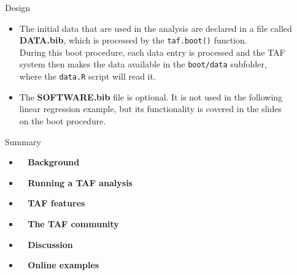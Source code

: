 \documentclass[aspectratio=169]{beamer}
\begin{document}
\begin{frame}{Design}\small
  \begin{itemize}
    \item[] The initial data that are used in the analysis are declared in a
    file called\\[0.2ex]
    {\bf\darkblue DATA.bib}, which is processed by the {\tt\blue taf.boot()}
    function.\\[4ex]
    During this boot procedure, each data entry is processed and the
    TAF\\[0.2ex]
    system then makes the data available in the {\tt boot/data}
    subfolder,\\[0.2ex]
    where the {\tt data.R} script will read it.\\[4ex]
    \item[] The {\bf\orange SOFTWARE.bib} file is optional. It is not used in
    the following\\
    linear regression example, but its functionality is covered in the slides\\
    on the boot procedure.
  \end{itemize}
\end{frame}


\begin{frame}{Summary}
  \begin{itemize}
    \item[] {\bf{}~ Background} \\[3ex]
    \item[] {\bf{}~ Running a TAF analysis} \\[3ex]
    \item[] {\bf{}~ TAF features} \\[3ex]
    \item[] {\bf{}~ The TAF community} \\[3ex]
    \item[] {\bf{}~ Discussion} \\[3ex]
    \item[] {\bf{}~ Online examples} \\[3ex]
  \end{itemize}
\end{frame}
\end{document}
